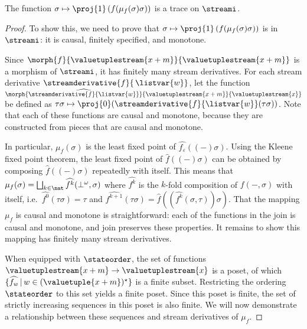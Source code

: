 \begin{proposition}
    The function \(\sigma \mapsto \proj{1}\left(f(\mu_f(\sigma)\sigma)\right)\)
    is a trace on \(\streami\).
\end{proposition}
\begin{proof}
    To show this, we need to prove that
    \(\sigma \mapsto \proj{1}\left(f(\mu_f(\sigma)\sigma)\right)\) is in
    \(\streami\): it is causal, finitely specified, and monotone.

    Since \(
    \morph{f}{\valuetuplestream{x+m}}{\valuetuplestream{x+m}}
    \) is a morphism of \(\streami\), it has finitely many stream derivatives.
    For each stream derivative \(\streamderivative{f}{\,\listvar{w}}\), let the
    function \(
    \morph{
        \widehat{\streamderivative{f}{\listvar{w}}}
    }{
        \valuetuplestream{x+m}
    }{
        \valuetuplestream{x}
    }
    \) be defined as \(
    \tau\sigma
    \mapsto
    \proj{0}(\streamderivative{f}{\listvar{w}}(\tau\sigma))
    \).
    Note that each of these functions are causal and monotone, because they are
    constructed from pieces that are causal and monotone.

    In particular, \(\mu_f(\sigma)\) is the least fixed point of
    \(\widehat{f_\varepsilon}\left((-)\sigma\right)\).
    Using the Kleene fixed point theorem, the least fixed point of
    \(\widehat{f}((-)\sigma)\) can be obtained by composing
    \(\widehat{f}((-)\sigma)\) repeatedly with itself.
    This means that \(
    \mu_f(\sigma)
    =
    \bigsqcup_{k \in \nat} \widehat{f^k}(\bot^\omega,\sigma)
    \) where \(\widehat{f^k}\) is the \(k\)-fold composition of \(f(-,\sigma)\)
    with itself, i.e.\ \(\widehat{f^0}(\tau\sigma) = \tau\) and \(
    \widehat{f^{k+1}}(\tau\sigma)
    =
    \widehat{f}\left(\left(\widehat{f^{k}}(\sigma, \tau)\right)\sigma\right)
    \).
    That the mapping \(\mu_f\) is causal and monotone is
    straightforward: each of the functions in the join is causal and monotone,
    and join preserves these properties.
    It remains to show this mapping has finitely many stream derivatives.

    When equipped with \(\stateorder\), the set of functions
    \(\valuetuplestream{x+m} \to \valuetuplestream{x}\)
    is a poset, of which
    \(\{\widehat{f_w} \,|\, w \in (\valuetuple{x+m})^\star\}\)
    is a finite subset.
    Restricting the ordering \(\stateorder\) to this set yields a finite poset.
    Since this poset is finite, the set of strictly increasing sequences in this
    poset is also finite.
    We will now demonstrate a relationship between these sequences and stream
    derivatives of \(\mu_f\).


\end{proof}
